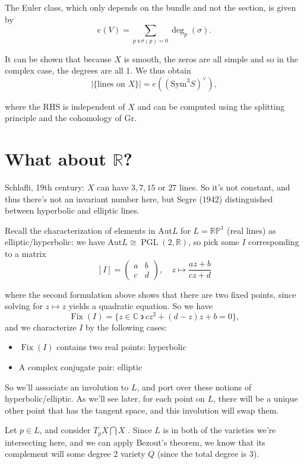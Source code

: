 \documentclass[11pt]{scrreprt}
\theoremstyle{definition}
\newcommand{\RR}[0]{{\mathbb{R}}}
\newcommand{\CC}[0]{{\mathbb{C}}}
\newcommand{\RP}[0]{{\mathbb{RP}}}
\newcommand{\Gr}[0]{{\text{Gr}}}
\newcommand{\dual}[0]{\vee}
\newcommand{\sym}[0]{\mathrm{Sym}}
\newcommand{\suchthat}[0]{{~\backepsilon ~}}
\newcommand{\theset}[1]{\{{#1}\}}
\newcommand{\abs}[1]{{\left\lvert #1 \right\rvert}}
\newcommand{\intersect}[0]{\bigcap}
\newcommand{\Aut}[0]{{\text{Aut}}}
\begin{document}
The Euler class, which only depends on the bundle and not the section,
is given by \[
e(V) = \sum_{p\suchthat \sigma(p) = 0} \deg_p(\sigma).
\]

It can be shown that because \(X\) is smooth, the zeros are all simple
and so in the complex case, the degrees are all 1. We thus obtain \[
\abs{\theset{\text{lines on } X}} = e((\sym^3 S)^\dual),
\]

where the RHS is independent of \(X\) and can be computed using the
splitting principle and the cohomology of \(\Gr\).

\hypertarget{what-about-rr}{%
\section{\texorpdfstring{What about
\(\RR\)?}{What about \textbackslash{}RR?}}\label{what-about-rr}}

Schlafli, 19th century: \(X\) can have \(3,7,15\) or \(27\) lines. So
it's not constant, and thus there's not an invariant number here, but
Segre (1942) distinguished between hyperbolic and elliptic lines.

Recall the characterization of elements in \(\Aut L\) for \(L=\RP^1\)
(real lines) as elliptic/hyperbolic: we have
\(\Aut L \cong \operatorname{PGL}(2, \RR)\), so pick some \(I\) corresponding
to a matrix \[
[I] = \begin{pmatrix}a & b \\ c & d\end{pmatrix},\quad  z\mapsto \frac{az+b}{cz+d}
\]

where the second formulation above shows that there are two fixed
points, since solving for \(z\mapsto z\) yields a quadratic equation. So
we have \[
\operatorname{Fix}(I) = \theset{z \in \CC \suchthat cz^2 + (d-z)z + b = 0},
\] and we characterize \(I\) by the following cases:
\begin{itemize}
  \item \(\operatorname{Fix}(I)\) contains two real points: hyperbolic
  \item A complex conjugate pair: elliptic
\end{itemize}

So we'll associate an involution to \(L\), and port over these notions
of hyperbolic/elliptic. As we'll see later, for each point on \(L\),
there will be a unique other point that has the tangent space, and this
involution will swap them.

Let \(p\in L\), and consider \(T_pX \intersect X\) . Since \(L\) is in
both of the varieties we're intersecting here, and we can apply Bezout's
theorem, we know that its complement will some degree 2 variety \(Q\)
(since the total degree is 3).
\end{document}
